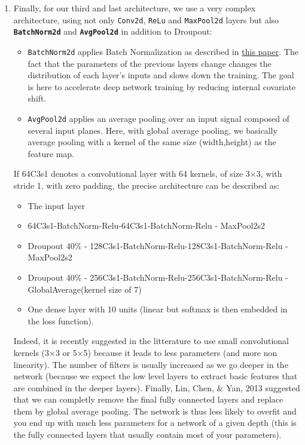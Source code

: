 \documentclass[10pt,a4paper]{article}
\providecommand{\tightlist}{%
  \setlength{\parskip}{0pt}
  }
\theoremstyle{break}
\begin{document}
\begin{enumerate}
\def\labelenumi{\arabic{enumi}.}
\setcounter{enumi}{2}
\item
  Finally, for our third and last architecture, we use a very complex architecture, using not only \texttt{Conv2d}, \texttt{ReLu} and \texttt{MaxPool2d} layers but also \textbf{\texttt{BatchNorm2d}} and \textbf{\texttt{AvgPool2d}} in addition to Droupout:

  \begin{itemize}
  \tightlist
  \item
    \texttt{BatchNorm2d} applies Batch Normalization as described in \href{https://arxiv.org/abs/1502.03167}{this paper}. The fact that the parameters of the previous layers change changes the distribution of each layer's inputs and slows down the training. The goal is here to accelerate deep network training by reducing internal covariate shift.
  \item
    \texttt{AvgPool2d} applies an average pooling over an input signal composed of several input planes. Here, with global average pooling, we basically average pooling with a kernel of the same size (width,height) as the feature map.
  \end{itemize}

  If 64C3s1 denotes a convolutional layer with 64 kernels, of size 3×3, with stride 1, with zero padding, the precise architecture can be described as:

  \begin{itemize}
  \tightlist
  \item
    The input layer
  \item
    64C3s1-BatchNorm-Relu-64C3s1-BatchNorm-Relu - MaxPool2s2
  \item
    Droupout 40\% - 128C3s1-BatchNorm-Relu-128C3s1-BatchNorm-Relu - MaxPool2s2
  \item
    Droupout 40\% - 256C3s1-BatchNorm-Relu-256C3s1-BatchNorm-Relu - GlobalAverage(kernel size of 7)
  \item
    One dense layer with 10 units (linear but softmax is then embedded in the loss function).
  \end{itemize}

  Indeed, it is recently suggested in the litterature to use small convolutional kernels (3×3 or 5×5) because it leads to less parameters (and more non linearity). The number of filters is usually increased as we go deeper in the network (because we expect the low level layers to extract basic features that are combined in the deeper layers). Finally, Lin, Chen, \& Yan, 2013 suggested that we can completly remove the final fully connected layers and replace them by global average pooling. The network is thus less likely to overfit and you end up with much less parameters for a network of a given depth (this is the fully connected layers that usually contain most of your parameters).
\end{enumerate}
\end{document}
